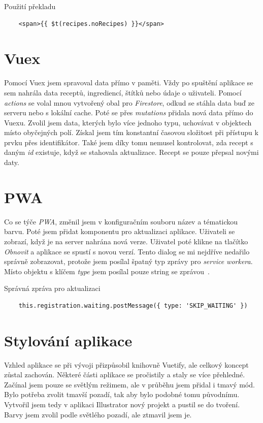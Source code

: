 \begin{listing}[H]
    \caption{Použití překladu}
    \begin{verbatim}
    <span>{{ $t(recipes.noRecipes) }}</span>
    \end{verbatim}
\end{listing}

\section{Vuex}
Pomocí Vuex jsem spravoval data přímo v paměti. Vždy po spuštění aplikace se sem nahrála data receptů, ingrediencí, štítků
nebo údaje o uživateli. Pomocí \emph{actions} se volal mnou vytvořený obal pro \emph{Firestore}, odkud se stáhla data buď ze serveru
nebo s lokální cache. Poté se přes \emph{mutations} přidala nová data přímo do Vuexu. Zvolil jsem data, kterých bylo více jednoho typu,
uchovávat v objektech místo obyčejných polí. Získal jsem tím konstantní časovou složitost při přístupu k prvku přes identifikátor. Také
jsem díky tomu nemusel kontrolovat, zda recept s daným \emph{id} existuje, když se stahovala aktualizace. Recept se pouze přepsal novými
daty.

\section{PWA}
Co se týče \emph{PWA}, změnil jsem v konfiguračním souboru název a tématickou barvu. Poté jsem přidat komponentu pro aktualizaci aplikace.
Uživateli se zobrazí, když je na server nahrána nová verze. Uživatel poté klikne na tlačítko \emph{Obnovit} a aplikace se spustí s novou verzí.
Tento dialog se mi nejdříve nedařilo správně zobrazovat, protože jsem posílal špatný typ zprávy pro \emph{service workera}. Místo objektu s
klíčem \emph{type} jsem posílal pouze string se zprávou~\cite{PWAServiceWorker}.

\begin{listing}[h]
    \caption{Správná zpráva pro aktualizaci}
    \begin{verbatim}
    this.registration.waiting.postMessage({ type: 'SKIP_WAITING' })
    \end{verbatim}
\end{listing}

\section{Stylování aplikace}
Vzhled aplikace se při vývoji přizpůsobil knihovně Vuetify, ale celkový koncept zůstal zachován. Některé části aplikace
se pročistily a staly se více přehledné. Začínal jsem pouze se světlým režimem, ale v průběhu jsem přidal i tmavý mód.
Bylo potřeba zvolit tmavší pozadí, tak aby bylo podobné tomu původnímu. Vytvořil jsem tedy v aplikaci Illustrator nový projekt
a pustil se do tvoření. Barvy jsem zvolil podle světlého pozadí, ale ztmavil jsem je.

